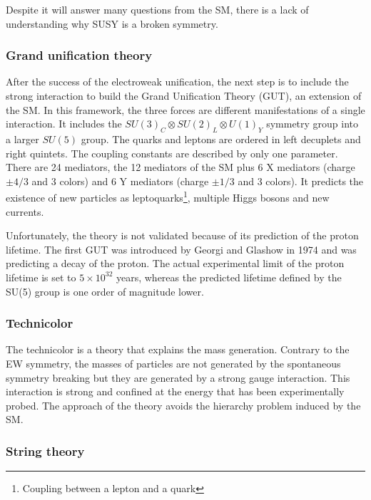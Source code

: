      Despite it will answer many questions from the \gls{SM}, there is a lack of understanding why SUSY is a broken symmetry.
      
      \subsubsection{Grand unification theory}
      
      After the success of the electroweak unification, the next step is to include the strong interaction to build the Grand Unification Theory (GUT), an extension of the \gls{SM}.
      In this framework, the three forces are different manifestations of a single interaction. 
      It includes the $SU(3)_C \otimes SU(2)_L \otimes U(1)_Y$ symmetry group into a larger $SU(5)$ group. 
      The quarks and leptons are ordered in left decuplets and right quintets.
      The coupling constants are described by only one parameter.  
      There are 24 mediators, the 12 mediators of the \gls{SM} plus 6 X mediators (charge $\pm4/3$ and 3 colors) and 6 Y mediators (charge $\pm1/3$ and 3 colors).
      It predicts the existence of new particles as leptoquarks\footnote{Coupling between a lepton and a quark}, multiple Higgs bosons and new currents.

      Unfortunately, the theory is not validated because of its prediction of the proton lifetime. 
      The first GUT was introduced by Georgi and Glashow in 1974 and was predicting a decay of the proton. 
      The actual experimental limit of the proton lifetime is set to $5 \times 10^{32}$ years, whereas the predicted lifetime defined by the SU(5) group is one order of magnitude lower.
      \cite{Agashe:2014kda}

      \subsubsection{Technicolor}

      The technicolor is a theory that explains the mass generation.
      Contrary to the EW symmetry, the masses of particles are not generated by the spontaneous symmetry breaking but they are generated by a strong gauge interaction.
      This interaction is strong and confined at the energy that has been experimentally probed.
      The approach of the theory avoids the hierarchy problem induced by the \gls{SM}.
      
      \subsubsection{String theory}

